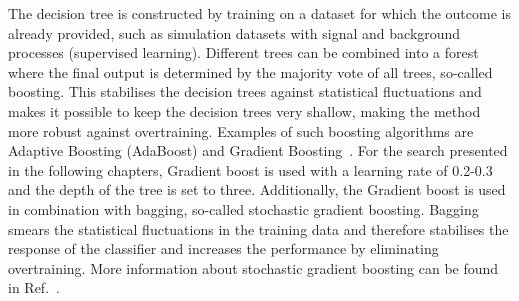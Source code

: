 The decision tree is constructed by training on a dataset for which the outcome is already provided, such as simulation datasets with signal and background processes (supervised learning). Different trees can be combined into a forest where the final output is determined by the majority vote of all trees, so-called boosting. This stabilises the decision trees against statistical fluctuations and makes it possible to keep the decision trees very shallow, making the method more robust against overtraining. Examples of such boosting algorithms are Adaptive Boosting (AdaBoost) and Gradient Boosting~\cite{2014arXiv1403.1452M}.  For the search presented in the following chapters, Gradient boost is used with a learning rate of 0.2-0.3 and the depth of the tree is set to three. Additionally, the Gradient boost is used in combination with bagging, so-called stochastic gradient boosting. Bagging smears the statistical fluctuations in the training data and therefore  stabilises the response of the classifier and increases the performance by eliminating overtraining.  More information about stochastic gradient boosting can be found in Ref.~\cite{Behnke:2013:DAH:2564838}.%


